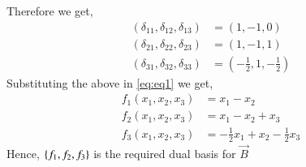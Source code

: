 \documentclass[journal,12pt,twocolumn]{IEEEtran}
\begin{document}
Therefore we get, 
\begin{align}
	(\delta_{11}, \delta_{12}, \delta_{13} ) &= (1, -1, 0)\\
	(\delta_{21}, \delta_{22}, \delta_{23} ) &= (1, -1, 1)\\
	(\delta_{31}, \delta_{32}, \delta_{33} ) &= (-\frac{1}{2}, 1, -\frac{1}{2})
\end{align}
Substituting the above in \eqref{eq:eq1} we get,
\begin{align}
	f_1(x_1, x_2, x_3) &= x_1 - x_2\\
	f_2(x_1, x_2, x_3) &= x_1 - x_2 + x_3\\
	f_3(x_1, x_2, x_3) &= -\frac{1}{2}x_1 + x_2 -\frac{1}{2} x_3
\end{align}
Hence, $\left\{f_1, f_2, f_3\right\}$ is the required dual basis for $\vec{B}$
\end{document}
